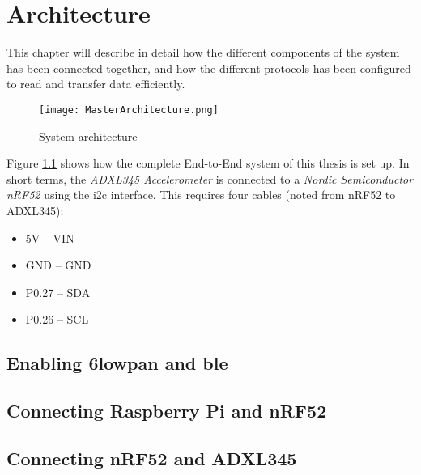 \chapter{Architecture}
\label{chp:architecture} 

This chapter will describe in detail how the different components of the system has been connected together, and how the different protocols has been configured to read and transfer data efficiently. 


\begin{figure}[h]
    \centering
    \texttt{[image: MasterArchitecture.png]}    \caption{System architecture}
    \label{fig:systemArchitecture}
\end{figure}

\newpage

Figure \ref{fig:systemArchitecture} shows how the complete End-to-End system of this thesis is set up. In short terms, the \textit{ADXL345 Accelerometer} is connected to a \textit{Nordic Semiconductor nRF52} using the \gls{i2c} interface. This requires four cables (noted from nRF52 to ADXL345): 

\begin{itemize}
  \item 5V -- VIN 
  \item GND -- GND 
  \item P0.27 -- SDA
  \item P0.26 -- SCL
\end{itemize}




\section{Enabling \gls{6lowpan} and \gls{ble}}



\section{Connecting Raspberry Pi and nRF52}

\section{Connecting nRF52 and ADXL345}

